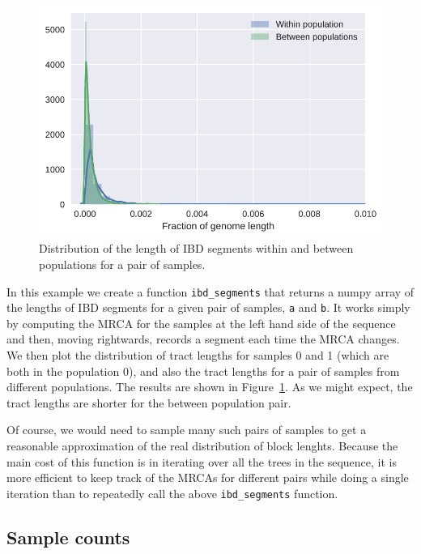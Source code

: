 \documentclass[graybox]{svmult}
\newcommand{\includenbimage}[1]{\begin{center}\texttt{[image: \#1]}\end{center}}
\begin{document}
\begin{figure}
\begin{center}
\includegraphics[width=\textwidth]{images/processing-results_5_0.pdf}
\end{center}
\caption{\label{fig:ibd_segments}Distribution of the length of IBD
segments within and between populations for a pair of samples.}
\end{figure}

In this example we create a function \texttt{ibd\_segments} that returns
a numpy array of the lengths of IBD segments for a given pair of
samples, \texttt{a} and \texttt{b}. It works simply by computing the
MRCA for the samples at the left hand side of the sequence and then,
moving rightwards, records a segment each time the MRCA changes. We then
plot the distribution of tract lengths for samples 0 and 1 (which are
both in the population 0), and also the tract lengths for a pair of
samples from different populations. The results are shown in
Figure~\ref{fig:ibd_segments}. As we might expect, the tract
lengths are shorter for the between population pair.

Of course, we would need to sample many such pairs of samples to get a
reasonable approximation of the real distribution of block lenghts.
Because the main cost of this function is in iterating over all the
trees in the sequence, it is more efficient to keep track of the MRCAs
for different pairs while doing a single iteration than to repeatedly
call the above \texttt{ibd\_segments} function.

\subsection{Sample counts}\label{sample-counts}
\end{document}
